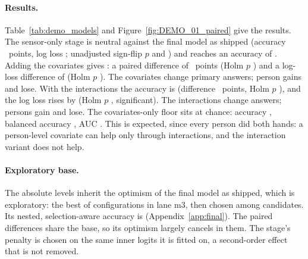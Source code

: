 \paragraph{Results.} Table~\ref{tab:demo_models} and Figure~\ref{fig:DEMO_01_paired} give the results. The
sensor-only stage is neutral against the final model as shipped (accuracy ~points,
log loss ; unadjusted sign-flip $p$  and
) and reaches an accuracy of . Adding the covariates gives
: a paired difference of ~points (Holm $p$ ) and a
log-loss difference of  (Holm $p$ ). The covariates change
 primary answers;  person gains and  lose. With the interactions the accuracy is
 (difference ~points, Holm $p$ ), and the log loss
rises by  (Holm $p$ , significant). The interactions change
 answers;  persons gain and  lose. The covariates-only floor sits at chance:
accuracy , balanced accuracy , AUC . This is
expected, since every person did both hands: a person-level covariate can help only through interactions, and the
interaction variant does not help.

\paragraph{Exploratory base.} The absolute levels inherit the optimism of the final model as shipped, which is
exploratory: the best of  configurations in lane m3, then chosen among
 candidates. Its nested, selection-aware accuracy is 
(Appendix~\ref{app:final}). The paired differences share the base, so its optimism largely cancels in them. The
stage's penalty is chosen on the same inner logits it is fitted on, a second-order effect that is not removed.

